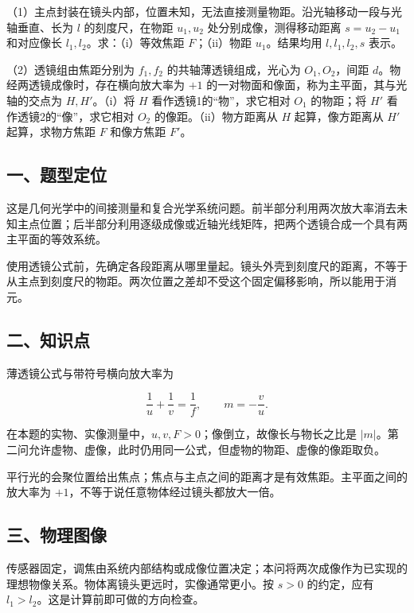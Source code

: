 \documentclass[12pt,a4paper,fontset=fandol]{ctexart}
\begin{document}
（1）主点封装在镜头内部，位置未知，无法直接测量物距。沿光轴移动一段与光轴垂直、长为
\(l\) 的刻度尺，在物距 \(u_1,u_2\) 处分别成像，测得移动距离
\(s=u_2-u_1\) 和对应像长 \(l_1,l_2\)。求：（i）等效焦距
\(F\)；（ii）物距 \(u_1\)。结果均用 \(l,l_1,l_2,s\) 表示。

（2）透镜组由焦距分别为 \(f_1,f_2\) 的共轴薄透镜组成，光心为
\(O_1,O_2\)，间距 \(d\)。物经两透镜成像时，存在横向放大率为 \(+1\)
的一对物面和像面，称为主平面，其与光轴的交点为 \(H,H'\)。（i）将 \(H\)
看作透镜1的``物''，求它相对 \(O_1\) 的物距；将 \(H'\)
看作透镜2的``像''，求它相对 \(O_2\) 的像距。（ii）物方距离从 \(H\)
起算，像方距离从 \(H'\) 起算，求物方焦距 \(F\) 和像方焦距 \(F'\)。

\subsection{一、题型定位}\label{ux4e00ux9898ux578bux5b9aux4f4d}

这是几何光学中的间接测量和复合光学系统问题。前半部分利用两次放大率消去未知主点位置；后半部分利用逐级成像或近轴光线矩阵，把两个透镜合成一个具有两主平面的等效系统。

使用透镜公式前，先确定各段距离从哪里量起。镜头外壳到刻度尺的距离，不等于从主点到刻度尺的物距。两次位置之差却不受这个固定偏移影响，所以能用于消元。

\subsection{二、知识点}\label{ux4e8cux77e5ux8bc6ux70b9}

薄透镜公式与带符号横向放大率为

\[\frac1u+\frac1v=\frac1f,\qquad m=-\frac vu.\]

在本题的实物、实像测量中，\(u,v,F>0\)；像倒立，故像长与物长之比是
\(|m|\)。第二问允许虚物、虚像，此时仍用同一公式，但虚物的物距、虚像的像距取负。

平行光的会聚位置给出焦点；焦点与主点之间的距离才是有效焦距。主平面之间的放大率为
\(+1\)，不等于说任意物体经过镜头都放大一倍。

\subsection{三、物理图像}\label{ux4e09ux7269ux7406ux56feux50cf}

传感器固定，调焦由系统内部结构或成像位置决定；本问将两次成像作为已实现的理想物像关系。物体离镜头更远时，实像通常更小。按
\(s>0\) 的约定，应有 \(l_1>l_2\)。这是计算前即可做的方向检查。
\end{document}
